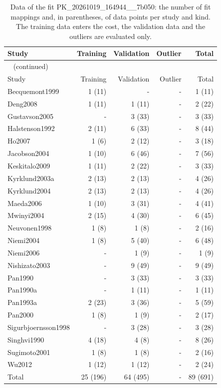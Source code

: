\begin{longtable}{lrrrr}
\caption{Data of the fit PK\_20261019\_164944\_\_7b050: the number of fit mappings and, in parentheses, of data points per study and kind. The training data enters the cost, the validation data and the outliers are evaluated only.}\label{tab:data:PK_20261019_164944__7b050} \\
\toprule
Study & Training & Validation & Outlier & Total \\
\midrule
\endfirsthead
\multicolumn{5}{l}{\small\tablename~\thetable{} (continued)} \\
\toprule
Study & Training & Validation & Outlier & Total \\
\midrule
\endhead
\bottomrule
\endlastfoot
Becquemont1999 & 1 (11) & - & - & 1 (11) \\
Deng2008 & 1 (11) & 1 (11) & - & 2 (22) \\
Gustavson2005 & - & 3 (33) & - & 3 (33) \\
Halstenson1992 & 2 (11) & 6 (33) & - & 8 (44) \\
Ho2007 & 1 (6) & 2 (12) & - & 3 (18) \\
Jacobson2004 & 1 (10) & 6 (46) & - & 7 (56) \\
Keskitalo2009 & 1 (11) & 2 (22) & - & 3 (33) \\
Kyrklund2003a & 2 (13) & 2 (13) & - & 4 (26) \\
Kyrklund2004 & 2 (13) & 2 (13) & - & 4 (26) \\
Maeda2006 & 1 (10) & 3 (31) & - & 4 (41) \\
Mwinyi2004 & 2 (15) & 4 (30) & - & 6 (45) \\
Neuvonen1998 & 1 (8) & 1 (8) & - & 2 (16) \\
Niemi2004 & 1 (8) & 5 (40) & - & 6 (48) \\
Niemi2006 & - & 1 (9) & - & 1 (9) \\
Nishizato2003 & - & 9 (49) & - & 9 (49) \\
Pan1990 & - & 3 (33) & - & 3 (33) \\
Pan1990a & - & 1 (11) & - & 1 (11) \\
Pan1993a & 2 (23) & 3 (36) & - & 5 (59) \\
Pan2000 & 1 (8) & 1 (9) & - & 2 (17) \\
Sigurbjoernsson1998 & - & 3 (28) & - & 3 (28) \\
Singhvi1990 & 4 (18) & 4 (8) & - & 8 (26) \\
Sugimoto2001 & 1 (8) & 1 (8) & - & 2 (16) \\
Wu2012 & 1 (12) & 1 (12) & - & 2 (24) \\
Total & 25 (196) & 64 (495) & - & 89 (691) \\
\end{longtable}

